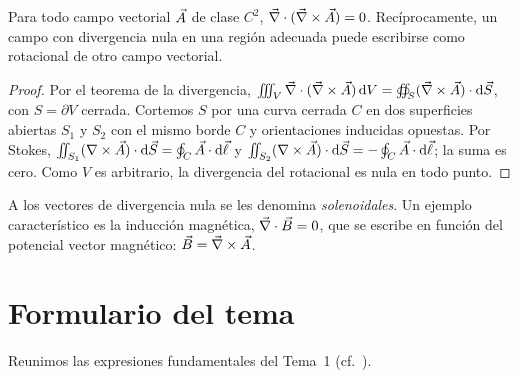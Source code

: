 \begin{proposicion}\label{prop:div-rot}
Para todo campo vectorial $\vec{A}$ de clase $C^{2}$, $\vec{\nabla}\cdot(\vec{\nabla}\times\vec{A})=0$. Recíprocamente, un campo con divergencia nula en una región adecuada puede escribirse como rotacional de otro campo vectorial.
\end{proposicion}
\begin{proof}
Por el teorema de la divergencia, $\iiint_{V}\vec{\nabla}\cdot(\vec{\nabla}\times\vec{A})\,\mathrm{d} V=\oiint_{S}(\vec{\nabla}\times\vec{A})\cdot\mathrm{d}\vec{S}$, con $S=\partial V$ cerrada. Cortemos $S$ por una curva cerrada $C$ en dos superficies abiertas $S_1$ y $S_2$ con el mismo borde $C$ y
orientaciones inducidas opuestas. Por Stokes, $\iint_{S_1}(\nabla\times\vec{A})\cdot\mathrm{d}\vec{S}=\oint_{C}\vec{A}\cdot\mathrm{d}\vec{\ell}$ y $\iint_{S_2}(\nabla\times\vec{A})\cdot\mathrm{d}\vec{S}=-\oint_{C}\vec{A}\cdot\mathrm{d}\vec{\ell}$; la suma es cero. Como $V$ es arbitrario, la divergencia del rotacional
es nula en todo punto.
\end{proof}
A los vectores de divergencia nula se les denomina \emph{solenoidales}. Un ejemplo característico es la inducción magnética, $\vec{\nabla}\cdot\vec{B}=0$, que se escribe en función del potencial vector magnético: $\vec{B}=\vec{\nabla}\times\vec{A}$.

\section{Formulario del tema}\label{app:formulario}
Reunimos las expresiones fundamentales del Tema~1 (cf.~\cite{FORMULARIO}).

